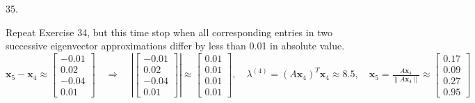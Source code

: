 \documentclass[12pt]{book}
\begin{document}
\begin{CJK}{UTF8}{bsmi}
35. \begin{minipage}[t]{\dimexpr\linewidth-2em}
Repeat Exercise 34, but this time stop when all corresponding entries in two successive eigenvector approximations differ by less than 0.01 in absolute value. \\
$\displaystyle\textbf{x}_5-\textbf{x}_4\approx\begin{bmatrix}
-0.01 \\ 0.02 \\ -0.04 \\ 0.01
\end{bmatrix}\quad\Rightarrow\quad\left|\begin{bmatrix}
-0.01 \\ 0.02 \\ -0.04 \\ 0.01
\end{bmatrix}\right|\approx\begin{bmatrix}
0.01 \\ 0.01 \\ 0.01 \\ 0.01
\end{bmatrix},\quad\lambda^{(4)}=(A\textbf{x}_4)^T\textbf{x}_4\approx 8.5,\quad\textbf{x}_5=\frac{A\textbf{x}_4}{\parallel A\textbf{x}_4\parallel}\approx\begin{bmatrix}
0.17 \\ 0.09 \\ 0.27 \\ 0.95
\end{bmatrix}$
\end{minipage}\\

\end{CJK}
\end{document}

